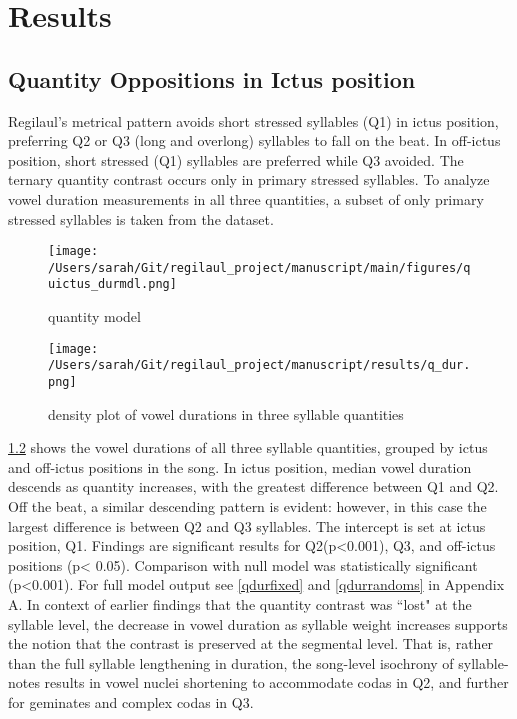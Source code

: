 \chapter{Results}
%

\section{Quantity Oppositions in Ictus position}

Regilaul's metrical pattern avoids short stressed syllables (Q1) in ictus position, preferring Q2 or Q3 (long and overlong) syllables to fall on the beat. In off-ictus position, short stressed (Q1) syllables are preferred while Q3 avoided.
The ternary quantity contrast occurs only in primary stressed syllables. To analyze vowel duration measurements in all three quantities, a subset of only primary stressed syllables is taken from the dataset. 

\begin{figure}[htb]
\begin{center}
\texttt{[image: /Users/sarah/Git/regilaul\_project/manuscript/main/figures/quictus\_durmdl.png]}
\caption{quantity model}
\label{qmdlt}
\end{center}
\end{figure}


\begin{figure}[htb]
\centering
\texttt{[image: /Users/sarah/Git/regilaul\_project/manuscript/results/q\_dur.png]}
\caption{density plot of vowel durations in three syllable quantities}
\label{qdur}

\end{figure}
%


\ref{qdur} shows the vowel durations of all three syllable quantities, grouped by ictus and off-ictus positions in the song. In ictus position, median vowel duration descends as quantity increases, with the greatest difference between Q1 and Q2. Off the beat, a similar descending pattern is evident: however, in this case the largest difference is between Q2 and Q3 syllables. 
 The intercept is set at ictus position, Q1. Findings are significant results for Q2(p<0.001), Q3, and off-ictus positions (p< 0.05). Comparison with null model was statistically significant (p<0.001). For full model output see \ref{qdurfixed} and \ref{qdurrandoms} in Appendix A. In context of earlier findings that the quantity contrast was ``lost" at the syllable level, the decrease in vowel duration as syllable weight increases supports the notion that the contrast is preserved at the segmental level. That is, rather than the full syllable lengthening in duration, the song-level isochrony of syllable-notes results in vowel nuclei shortening to accommodate codas in Q2, and further for geminates and complex codas in Q3. 
 
